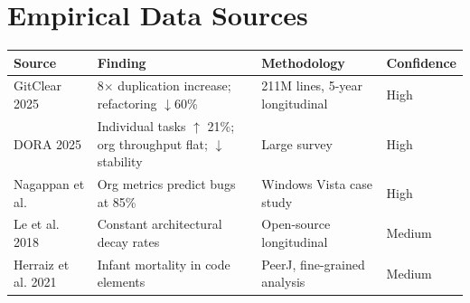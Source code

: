 \documentclass[11pt, a4paper, copyright]{googledeepmind}
\begin{document}
\section{Empirical Data Sources}
\label{app:data}

\begin{center}
\begin{tabular}{lp{4cm}p{4cm}l}
\toprule
Source & Finding & Methodology & Confidence \\
\midrule
GitClear 2025 & 8$\times$ duplication increase; refactoring $\downarrow$60\% & 211M lines, 5-year longitudinal & High \\
DORA 2025 & Individual tasks $\uparrow$ 21\%; org throughput flat; $\downarrow$ stability & Large survey & High \\
Nagappan et al. & Org metrics predict bugs at 85\% & Windows Vista case study & High \\
Le et al. 2018 & Constant architectural decay rates & Open-source longitudinal & Medium \\
Herraiz et al. 2021 & Infant mortality in code elements & PeerJ, fine-grained analysis & Medium \\
\bottomrule
\end{tabular}
\end{center}
\end{document}
